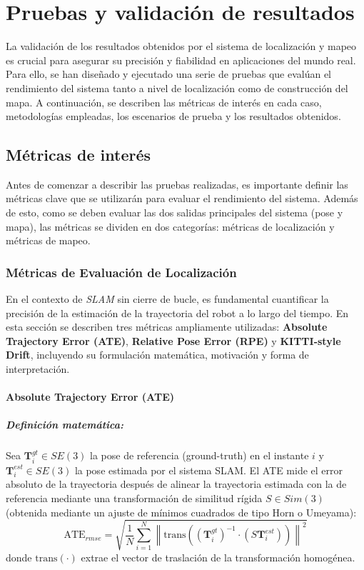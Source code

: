 \documentclass[12pt, a4paper, twoside]{article}
\begin{document}
\section{Pruebas y validación de resultados}
La validación de los resultados obtenidos por el sistema de localización y mapeo es crucial para asegurar su precisión y fiabilidad en aplicaciones del mundo real. Para ello, se han diseñado y 
ejecutado una serie de pruebas que evalúan el rendimiento del sistema tanto a nivel de localización como de construcción del mapa. A continuación, se describen las métricas de interés en cada caso, 
metodologías empleadas, los escenarios de prueba y los resultados obtenidos.

\subsection{Métricas de interés}
Antes de comenzar a describir las pruebas realizadas, es importante definir las métricas clave que se utilizarán para evaluar el rendimiento del sistema. Además de esto, como se deben evaluar las dos 
salidas principales del sistema (pose y mapa), las métricas se dividen en dos categorías: métricas de localización y métricas de mapeo.

\subsubsection{Métricas de Evaluación de Localización}

En el contexto de \textit{SLAM} sin cierre de bucle, es fundamental cuantificar 
la precisión de la estimación de la trayectoria del robot a lo largo del tiempo. 
En esta sección se describen tres métricas ampliamente utilizadas: 
\textbf{Absolute Trajectory Error (ATE\cite{Chen2022DELOATE})}, 
\textbf{Relative Pose Error (RPE\cite{Sturm2012RPE})} y 
\textbf{KITTI-style Drift\cite{Geiger2013KITTI}}, incluyendo su formulación matemática, motivación y forma de interpretación. 
\newpage

\paragraph{Absolute Trajectory Error (ATE\cite{Chen2022DELOATE})}

\subparagraph{Definición matemática:}
Sea $\mathbf{T}^{gt}_i \in SE(3)$ la pose de referencia (ground-truth) en el instante $i$ 
y $\mathbf{T}^{est}_i \in SE(3)$ la pose estimada por el sistema SLAM\cite{smith1987slam}.
El ATE\cite{Chen2022DELOATE} mide el error absoluto de la trayectoria después de alinear la trayectoria estimada 
con la de referencia mediante una transformación de similitud rígida $S \in Sim(3)$
(obtenida mediante un ajuste de mínimos cuadrados de tipo Horn o Umeyama):
\[
\text{ATE}_{rmse} = 
\sqrt{\frac{1}{N}\sum_{i=1}^{N} 
\left\| 
\mathrm{trans}\!\left(
(\mathbf{T}^{gt}_i)^{-1} \cdot (S \mathbf{T}^{est}_i)
\right)
\right\|^2 }
\]
donde $\mathrm{trans}(\cdot)$ extrae el vector de traslación de la transformación homogénea.
\end{document}
